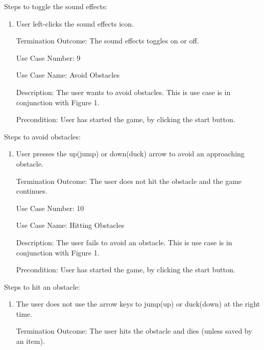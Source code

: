 \documentclass[10pt,conference,onecolumn,compsoc]{IEEEtran}
\begin{document}
Steps to toggle the sound effects:

\begin{enumerate}
\item User left-clicks the sound effects icon.
\item[Termination Outcome:] The sound effects toggles on or off.\\
\end{enumerate}

\begin{itemize}
\item[Use Case Number:] 9
\item[Use Case Name:] Avoid Obstacles
\item[Description:] The user wants to avoid obstacles. This is use case is in conjunction with Figure 1.
\item[Precondition:] User has started the game, by clicking the start button.
\end{itemize}

Steps to avoid obstacles:

\begin{enumerate}
\item User presses the up(jump) or down(duck) arrow to avoid an approaching obstacle.
\item[Termination Outcome:] The user does not hit the obstacle and the game continues.\\
\end{enumerate}

\begin{itemize}
\item[Use Case Number:] 10
\item[Use Case Name:] Hitting Obstacles
\item[Description:] The user fails to avoid an obstacle. This is use case is in conjunction with Figure 1.
\item[Precondition:] User has started the game, by clicking the start button.
\end{itemize}

Steps to hit an obstacle:

\begin{enumerate}
\item The user does not use the arrow keys to jump(up) or duck(down) at the right time.
\item[Termination Outcome:]The user hits the obstacle and dies (unless saved by an item).
\end{enumerate}
\end{document}
